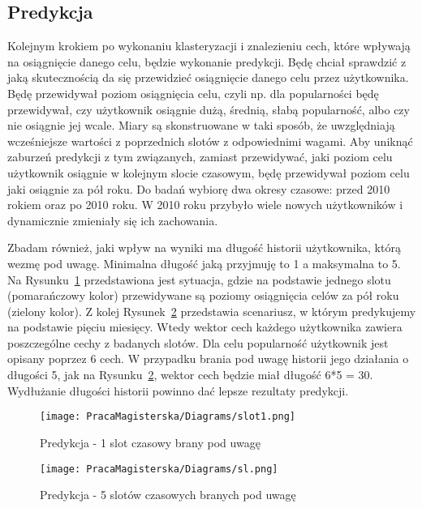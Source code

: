 \documentclass[polish,12pt]{aghthesis}
\begin{document}
\subsection{Predykcja}

Kolejnym krokiem po wykonaniu klasteryzacji i znalezieniu cech, które wpływają na osiągnięcie danego celu, będzie wykonanie predykcji. Będę chciał sprawdzić z jaką skutecznością da się przewidzieć osiągnięcie danego celu przez użytkownika. Będę przewidywał poziom osiągnięcia celu, czyli np. dla popularności będę przewidywał, czy użytkownik osiągnie dużą, średnią, słabą popularność, albo czy nie osiągnie jej wcale. Miary są skonstruowane w taki sposób, że uwzględniają wcześniejsze wartości z poprzednich slotów z odpowiednimi wagami. Aby uniknąć zaburzeń predykcji z tym związanych, zamiast przewidywać, jaki poziom celu użytkownik osiągnie w kolejnym slocie czasowym, będę przewidywał poziom celu jaki osiągnie za pół roku. Do badań wybiorę dwa okresy czasowe: przed 2010 rokiem oraz po 2010 roku. W 2010 roku przybyło wiele nowych użytkowników i dynamicznie zmieniały się ich zachowania.

Zbadam również, jaki wpływ na wyniki ma długość historii użytkownika, którą wezmę pod uwagę. Minimalna długość jaką przyjmuję to 1 a maksymalna to 5. Na Rysunku~\ref{predic1} przedstawiona jest sytuacja, gdzie na podstawie jednego slotu (pomarańczowy kolor) przewidywane są poziomy osiągnięcia celów za pół roku (zielony kolor). Z kolej Rysunek~\ref{predic5} przedstawia scenariusz, w którym predykujemy na podstawie pięciu miesięcy. Wtedy wektor cech każdego użytkownika zawiera poszczególne cechy z badanych slotów. Dla celu popularność użytkownik jest opisany poprzez 6 cech. W przypadku brania pod uwagę historii jego działania o długości 5, jak na Rysunku~\ref{predic5}, wektor cech będzie miał długość 6*5 = 30. Wydłużanie długości historii powinno dać lepsze rezultaty predykcji.

     \begin{figure}[ht]
    \centering
    \texttt{[image: PracaMagisterska/Diagrams/slot1.png]}
    \caption{Predykcja - 1 slot czasowy brany pod uwagę}
    \label{predic1}
\end{figure}

    \FloatBarrier


     \begin{figure}[ht]
    \centering
    \texttt{[image: PracaMagisterska/Diagrams/sl.png]}
    \caption{Predykcja - 5 slotów czasowych branych pod uwagę}
    \label{predic5}
\end{figure}
\end{document}
